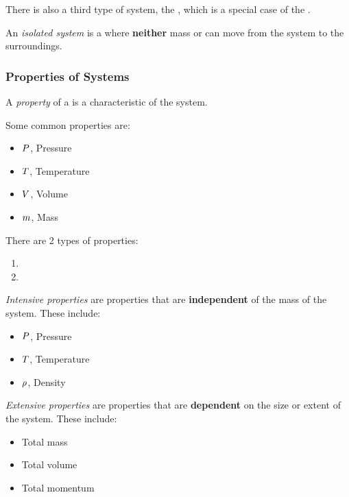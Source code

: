 There is also a third type of system, the , which is a special case of the .
\begin{definition}\label{def:Isolated_System}
  An \emph{isolated system} is a  where \textbf{neither} mass or  can move from the system to the surroundings.
\end{definition}

\subsubsection{Properties of Systems}\label{subsubsec:Properties_Systems}
\begin{definition}[Property]\label{def:Property}
  A \emph{property} of a  is a characteristic of the system.
\end{definition}

Some common properties are:
\begin{itemize}[noitemsep]
\item $P$, Pressure
\item $T$, Temperature
\item $V$, Volume
\item $m$, Mass
\end{itemize}

There are 2 types of properties:
\begin{enumerate}[noitemsep]
\item {}
\item {}
\end{enumerate}

\begin{definition}\label{def:Intensive_Property}
  \emph{Intensive properties} are properties that are \textbf{independent} of the mass of the system.
  These include:
  \begin{itemize}[noitemsep]
  \item $P$, Pressure
  \item $T$, Temperature
  \item $\rho$, Density
  \end{itemize}
\end{definition}

\begin{definition}\label{def:Extensive_Property}
  \emph{Extensive properties} are properties that are \textbf{dependent} on the size or extent of the system.
  These include:
  \begin{itemize}[noitemsep]
  \item Total mass
  \item Total volume
  \item Total momentum
  \end{itemize}
\end{definition}

